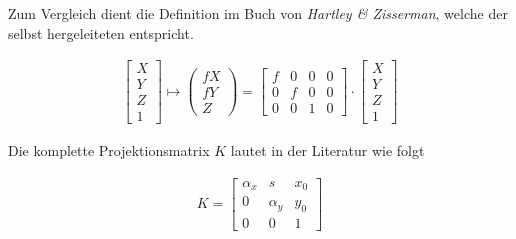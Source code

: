 		Zum Vergleich dient die Definition im Buch von \textit{Hartley \& Zisserman}\cite{HZ}, welche der selbst hergeleiteten entspricht.
		
		
					\begin{gather}
		\begin{bmatrix}
		X\\Y\\Z\\1
		\end{bmatrix} \mapsto
		\begin{pmatrix}
		f X\\ f Y\\ Z
		\end{pmatrix}
		=
		\begin{bmatrix}
		f&0&0&0\\
		0&f&0&0\\
		0&0&1&0
		\end{bmatrix}
		\cdot
		\begin{bmatrix}
		X\\Y\\Z\\1
		\end{bmatrix}
		\end{gather}		
		
		
		Die komplette Projektionsmatrix $K$ lautet in der Literatur wie folgt\cite{HZ}
		
		\begin{gather}
		K=\begin{bmatrix}
		\alpha_x&s&x_{0}\\
		0&\alpha_y&y_{0}\\
		0&0&1
		\end{bmatrix}
		\end{gather}
		
